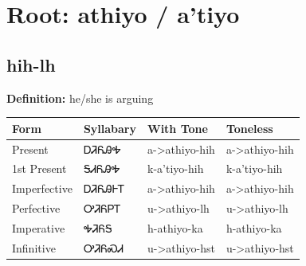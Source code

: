 \documentclass{article}%
\begin{document}
%
\normalsize%
\section*{Root: athiyo / a'tiyo}%
\subsection*{hih-lh}%
\textbf{Definition: }%
he/she is arguing%
\\[0.5em]%
\begin{tabular}{|l|l|l|l|}%
\hline%
\textbf{Form}&\textbf{Syllabary}&\textbf{With Tone}&\textbf{Toneless}\\%
\hline%
Present&ᎠᏘᏲᎯᎭ&a{-}>athiyo{-}hih&a{-}>athiyo{-}hih\\%
1st Present&ᎦᏗᏲᎯᎭ&k{-}a'tiyo{-}hih&k{-}a'tiyo{-}hih\\%
Imperfective&ᎠᏘᏲᎯᎰᎢ&a{-}>athiyo{-}hih&a{-}>athiyo{-}hih\\%
Perfective&ᎤᏘᏲᏢᎢ&u{-}>athiyo{-}lh&u{-}>athiyo{-}lh\\%
Imperative&ᎭᏘᏲᎦ&h{-}athiyo{-}ka&h{-}athiyo{-}ka\\%
Infinitive&ᎤᏘᏲᏍᏗ&u{-}>athiyo{-}hst&u{-}>athiyo{-}hst\\%
\hline%
\end{tabular}%
\\[1em]%
\end{document}
